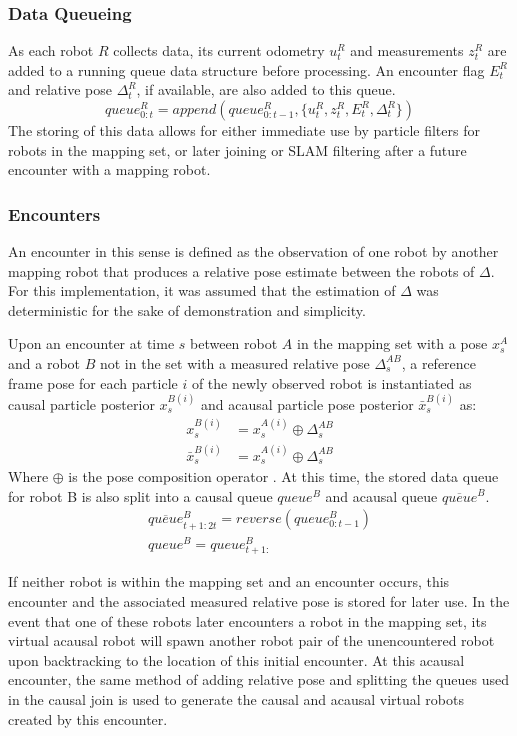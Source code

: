 \subsubsection{Data Queueing}
As each robot $R$ collects data, its current odometry $u_t^R$ and measurements $z_t^R$ are added to a running queue data structure before processing. An encounter flag $E_t^R$ and relative pose $\Delta_t^R$, if available, are also added to this queue. 
$$queue_{0:t}^R = append(queue_{0:t-1}^R, \{ u_t^R, z_t^R, E_t^R, \Delta_t^R \})$$
The storing of this data allows for either immediate use by particle filters for robots in the mapping set, or later joining or SLAM filtering after a future encounter with a mapping robot.
\vspace{0.1in}
\subsubsection{Encounters}
An encounter in this sense is defined as the observation of one robot by another mapping robot that produces a relative pose estimate between the robots of $\Delta$. For this implementation, it was assumed that the estimation of $\Delta$ was deterministic for the sake of demonstration and simplicity.

Upon an encounter at time $s$ between robot $A$ in the mapping set with a pose $x_s^A$ and a robot $B$ not in the set with a measured relative pose $\Delta_s^{AB}$, a reference frame pose for each particle $i$ of the newly observed robot is instantiated as causal particle posterior $x_s^{B(i)}$ and acausal particle pose posterior $\bar{x}_s^{B(i)}$ as:
\begin{align*}
x_s^{B(i)} &= x_s^{A(i)} \oplus \Delta_s^{AB} \\
\bar{x}_s^{B(i)} &= x_s^{A(i)} \oplus \Delta_s^{AB}
\end{align*}
Where $\oplus$ is the pose composition operator \cite{smithSelfCheeseman1990}.
At this time, the stored data queue for robot B is also split into a causal queue $queue^B$ and acausal queue $\overline{queue}^B$.
\begin{align*}
\overline{queue}_{t+1:2t}^B = reverse(queue_{0:t-1}^B) \\
queue^B = queue_{t+1:}^B
\end{align*}

If neither robot is within the mapping set and an encounter occurs, this encounter and the associated measured relative pose is stored for later use. In the event that one of these robots later encounters a robot in the mapping set, its virtual acausal robot will spawn another robot pair of the unencountered robot upon backtracking to the location of this initial encounter. At this acausal encounter, the same method of adding relative pose and splitting the queues used in the causal join is used to generate the causal and acausal virtual robots created by this encounter.

